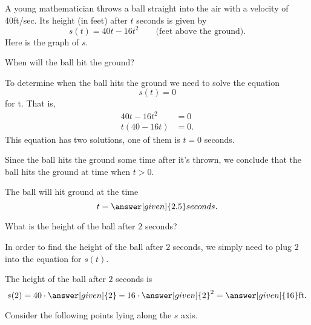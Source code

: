 \documentclass{ximera}
\begin{document}
\begin{example}
A young mathematician throws a ball straight into the air with 
a velocity of 40ft/sec. Its height (in feet) after $t$ seconds 
is given by
\[
s(t) = 40t-16t^2 \qquad\text{(feet above the ground)} .
\]
Here is the graph of $s$.











\begin{question}
When will the ball hit the ground?

\begin{explanation}
To determine when the ball hits the ground we need to solve the
equation
\[
s(t)=0
\]
for t.  That is,
\begin{align*}
40t-16t^2 &= 0\\
t(40-16t) &= 0.
\end{align*}
This  equation has two solutions, one of them is $t=0$
seconds.
 
   Since the ball hits
the ground  some time after it's
thrown, we conclude that the ball hits the ground at time when $t>0$.
\end{explanation}
The ball will hit ground at the time
\[
t=\answer[given]{2.5}seconds.
\]

\end{question}
\begin{question}
What is the height of the ball after $2$ seconds?

\begin{explanation}
In order to find the height of the ball after $2$ seconds, we simply need 
to plug $2$ into the equation for $s(t)$.
\end{explanation} 
The height of the ball after $2$ seconds is
\[
s(2) = 40\cdot\answer[given]{2} - 16\cdot\answer[given]{2}^2 = 
\answer[given]{16}\mathrm{ft.}
\]

\end{question}

 Consider the following points lying along the $s$ axis.


























\end{example}
\end{document}
